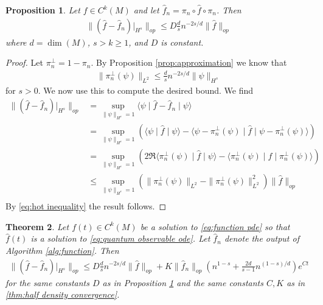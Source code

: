 \documentclass[12pt]{amsart}
\newtheorem{thm}{Theorem}[section]
\newtheorem{prop}[thm]{Proposition}
\begin{document}
\begin{prop} \label{prop:function approximation}
	Let $f \in C^{k}(M)$ and let $\hat{f}_{n} = \pi_{n} \circ \hat{f} \circ \pi_{n}$.  Then
	\begin{align}
		\| ( \hat{f} - \hat{f}_{n} )|_{H^{s}} \|_{op} \leq D \frac{d}{s} n^{-2s/d} \| \hat{f} \|_{op}
	\end{align}
	where $d= \dim(M)$, $s > k \geq 1$, and $D$ is constant.
\end{prop}
\begin{proof}
	Let $\pi_{n}^{\perp} = 1 - \pi_{n}$.  By Proposition \ref{prop:approximation} we know that
	\begin{align}
		\| \pi_{n}^{\perp}(\psi) \|_{L^{2}} \leq \frac{d}{s} n^{-2s/d} \| \psi \|_{H^{s}} \label{eq:hot inequality}
	\end{align}
	for $s>0$.  We now use this to compute the desired bound.  We find
	\begin{align}
		\| (\hat{f} - \hat{f}_{n})|_{H^{s}} \|_{op} &= \sup_{\| \psi \|_{H^{s}}=1} \langle \psi \mid \hat{f} - \hat{f}_{n} \mid \psi \rangle \\
			&= \sup_{\| \psi \|_{H^{s}}=1} \left( \langle \psi \mid \hat{f}  \mid \psi \rangle - \langle \psi - \pi_{n}^{\perp}(\psi) \mid \hat{f} \mid \psi - \pi_{n}^{\perp}(\psi) \rangle \right) \\
			&= \sup_{\| \psi \|_{H^{s}}=1} \left( 2 \Re \langle \pi_{n}^{\perp}(\psi) \mid \hat{f} \mid \psi \rangle - \langle \pi_{n}^{\perp}(\psi) \mid \hat{f} \mid \pi_{n}^{\perp}(\psi) \rangle \right) \\
			&\leq \sup_{\| \psi \|_{H^{s}}=1}  ( \| \pi_{n}^{\perp}(\psi) \|_{L^{2}}- \| \pi_{n}^{\perp}(\psi) \|_{L^{2}}^{2} ) \| \hat{f} \|_{op} \\
	\end{align}
	By \eqref{eq:hot inequality} the result follows.
\end{proof}

\begin{thm} \label{thm:function convergence}
	Let $f(t) \in C^{k}(M)$ be a solution to \eqref{eq:function pde} so that $\hat{f}(t)$ is a solution to \eqref{eq:quantum observable ode}.
	Let $\hat{f}_{n}$ denote the output of Algorithm \ref{alg:function}.
	Then
	\begin{align}
		\| ( \hat{f} - \hat{f}_{n})|_{H^{s}} \|_{op} \leq D \frac{d}{s} n^{-2s/d} \| \hat{f} \|_{op}+  K \| \hat{f}_{n} \|_{op} \left( n^{1-s} + \frac{2d}{s -1} n^{(1-s)/d} \right) e^{Ct}
	\end{align}
	for the same constants $D$ as in Proposition \ref{prop:function approximation} and the same constants $C,K$ as in \ref{thm:half density convergence}.
\end{thm}
\end{document}
